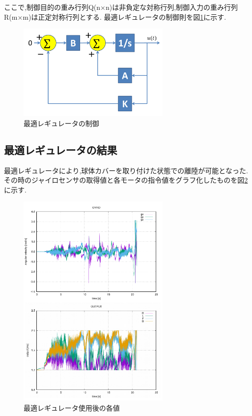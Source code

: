 \documentclass[12pt,oneside]{sotsuken_paper}
\begin{document}
ここで,制御目的の重み行列Q(n×n)は非負定な対称行列,制御入力の重み行列R(m×m)は正定対称行列とする.\cite{regyuu}
最適レギュレータの制御則を図\ref{fig:regyureta}に示す.

\begin{figure}[htbp]
	\begin{center}
		\includegraphics[width=75mm]{image/susiki/regyureta.png}
		\caption{最適レギュレータの制御}
		\label{fig:regyureta}
	\end{center}
\end{figure}

\subsection{最適レギュレータの結果}
最適レギュレータにより,球体カバーを取り付けた状態での離陸が可能となった.
その時のジャイロセンサの取得値と各モータの指令値をグラフ化したものを図\ref{fig:regyu}に示す.

\begin{figure}[htbp]
	\begin{center}
		\includegraphics[width=75mm]{image/regyu.png}
		\caption{最適レギュレータ使用後の各値}
		\label{fig:regyu}
	\end{center}
\end{figure}
\end{document}
